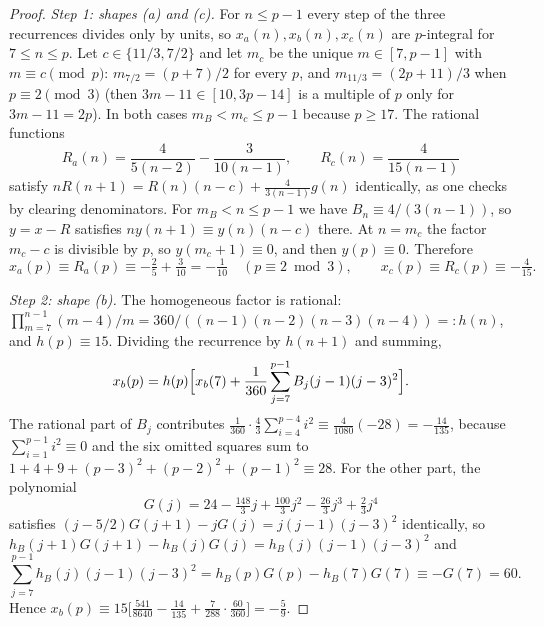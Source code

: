 \documentclass[11pt]{article}
\theoremstyle{remark}
\begin{document}
\begin{proof}
\emph{Step 1: shapes (a) and (c).} For $n\le p-1$ every step of the three recurrences divides only by units, so $x_a(n),x_b(n),x_c(n)$ are $p$-integral for $7\le n\le p$. Let $c\in\{11/3,7/2\}$ and let $m_c$ be the unique $m\in[7,p-1]$ with $m\equiv c\pmod p$: $m_{7/2}=(p+7)/2$ for every $p$, and $m_{11/3}=(2p+11)/3$ when $p\equiv2\pmod3$ (then $3m-11\in[10,3p-14]$ is a multiple of $p$ only for $3m-11=2p$). In both cases $m_B<m_c\le p-1$ because $p\ge17$. The rational functions
\[
 R_a(n)=\frac4{5(n-2)}-\frac3{10(n-1)},\qquad R_c(n)=\frac4{15(n-1)}
\]
satisfy $nR(n+1)=R(n)(n-c)+\frac4{3(n-1)}g(n)$ identically, as one checks by clearing denominators. For $m_B<n\le p-1$ we have $B_n\equiv4/(3(n-1))$, so $y=x-R$ satisfies $ny(n+1)\equiv y(n)(n-c)$ there. At $n=m_c$ the factor $m_c-c$ is divisible by $p$, so $y(m_c+1)\equiv0$, and then $y(p)\equiv0$. Therefore
\[
 x_a(p)\equiv R_a(p)\equiv-\tfrac25+\tfrac3{10}=-\tfrac1{10}\quad(p\equiv2\bmod3),\qquad x_c(p)\equiv R_c(p)\equiv-\tfrac4{15}.
\]

\emph{Step 2: shape (b).} The homogeneous factor is rational: $\prod_{m=7}^{n-1}(m-4)/m=360/((n-1)(n-2)(n-3)(n-4))=:h(n)$, and $h(p)\equiv15$. Dividing the recurrence by $h(n+1)$ and summing,
\[
 x_b(p)=h(p)\Bigl[x_b(7)+\frac1{360}\sum_{j=7}^{p-1}B_j(j-1)(j-3)^2\Bigr].
\]
The rational part of $B_j$ contributes $\frac1{360}\cdot\frac43\sum_{i=4}^{p-4}i^2\equiv\frac4{1080}(-28)=-\frac{14}{135}$, because $\sum_{i=1}^{p-1}i^2\equiv0$ and the six omitted squares sum to $1+4+9+(p-3)^2+(p-2)^2+(p-1)^2\equiv28$. For the other part, the polynomial
\[
 G(j)=24-\tfrac{148}3j+\tfrac{100}3j^2-\tfrac{26}3j^3+\tfrac23j^4
\]
satisfies $(j-5/2)G(j+1)-jG(j)=j(j-1)(j-3)^2$ identically, so $h_B(j+1)G(j+1)-h_B(j)G(j)=h_B(j)(j-1)(j-3)^2$ and
\[
 \sum_{j=7}^{p-1}h_B(j)(j-1)(j-3)^2=h_B(p)G(p)-h_B(7)G(7)\equiv-G(7)=60 .
\]
Hence $x_b(p)\equiv15\bigl[\frac{541}{8640}-\frac{14}{135}+\frac7{288}\cdot\frac{60}{360}\bigr]=-\frac59$.


\end{proof}
\end{document}
